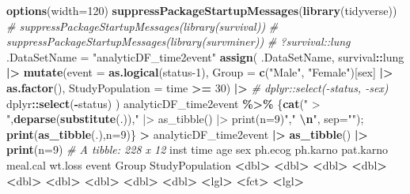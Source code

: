 \documentclass[
]{article}
\newenvironment{Shaded}{\begin{snugshade}}{\end{snugshade}}
\newcommand{\AttributeTok}[1]{\textcolor[rgb]{0.13,0.29,0.53}{#1}}
\newcommand{\CommentTok}[1]{\textcolor[rgb]{0.56,0.35,0.01}{\textit{#1}}}
\newcommand{\DecValTok}[1]{\textcolor[rgb]{0.00,0.00,0.81}{#1}}
\newcommand{\ErrorTok}[1]{\textcolor[rgb]{0.64,0.00,0.00}{\textbf{#1}}}
\newcommand{\FunctionTok}[1]{\textcolor[rgb]{0.13,0.29,0.53}{\textbf{#1}}}
\newcommand{\NormalTok}[1]{#1}
\newcommand{\OtherTok}[1]{\textcolor[rgb]{0.56,0.35,0.01}{#1}}
\newcommand{\SpecialCharTok}[1]{\textcolor[rgb]{0.81,0.36,0.00}{\textbf{#1}}}
\newcommand{\StringTok}[1]{\textcolor[rgb]{0.31,0.60,0.02}{#1}}
\begin{document}
\begin{Shaded}
\begin{Highlighting}[]
\FunctionTok{options}\NormalTok{(}\AttributeTok{width=}\DecValTok{120}\NormalTok{)}
\FunctionTok{suppressPackageStartupMessages}\NormalTok{(}\FunctionTok{library}\NormalTok{(tidyverse))}
\CommentTok{\# suppressPackageStartupMessages(library(survival))}
\CommentTok{\# suppressPackageStartupMessages(library(survminer))}
\CommentTok{\# ?survival::lung}
\NormalTok{.DataSetName }\OtherTok{=} \StringTok{"analyticDF\_time2event"}
\FunctionTok{assign}\NormalTok{(}
\NormalTok{    .DataSetName, }
\NormalTok{    survival}\SpecialCharTok{::}\NormalTok{lung }\SpecialCharTok{|\textgreater{}} \FunctionTok{mutate}\NormalTok{(}\AttributeTok{event =} \FunctionTok{as.logical}\NormalTok{(status}\DecValTok{{-}1}\NormalTok{), }\AttributeTok{Group =} \FunctionTok{c}\NormalTok{(}\StringTok{"Male"}\NormalTok{, }\StringTok{"Female"}\NormalTok{)[sex] }\SpecialCharTok{|\textgreater{}} \FunctionTok{as.factor}\NormalTok{(), }\AttributeTok{StudyPopulation =}\NormalTok{ time }\SpecialCharTok{\textgreater{}=} \DecValTok{30}\NormalTok{) }\SpecialCharTok{|\textgreater{}}
        \CommentTok{\# dplyr::select({-}status, {-}sex)}
\NormalTok{        dplyr}\SpecialCharTok{::}\FunctionTok{select}\NormalTok{(}\SpecialCharTok{{-}}\NormalTok{status)}
\NormalTok{)}
\NormalTok{analyticDF\_time2event }\SpecialCharTok{\%\textgreater{}\%}\NormalTok{ \{}\FunctionTok{cat}\NormalTok{(}\StringTok{" \textgreater{} "}\NormalTok{,}\FunctionTok{deparse}\NormalTok{(}\FunctionTok{substitute}\NormalTok{(.)),}\StringTok{" |\textgreater{} as\_tibble() |\textgreater{} print(n=9)"}\NormalTok{,}\StringTok{"  }\SpecialCharTok{\textbackslash{}n}\StringTok{"}\NormalTok{, }\AttributeTok{sep=}\StringTok{""}\NormalTok{); }\FunctionTok{print}\NormalTok{(}\FunctionTok{as\_tibble}\NormalTok{(.),}\AttributeTok{n=}\DecValTok{9}\NormalTok{)\}}
 \SpecialCharTok{\textgreater{}}\NormalTok{ analyticDF\_time2event }\SpecialCharTok{|\textgreater{}} \FunctionTok{as\_tibble}\NormalTok{() }\SpecialCharTok{|\textgreater{}} \FunctionTok{print}\NormalTok{(}\AttributeTok{n=}\DecValTok{9}\NormalTok{)  }
\CommentTok{\# A tibble: 228 x 12}
\NormalTok{   inst  time   age   sex ph.ecog ph.karno pat.karno meal.cal wt.loss event Group  StudyPopulation}
  \SpecialCharTok{\textless{}}\NormalTok{dbl}\SpecialCharTok{\textgreater{}} \ErrorTok{\textless{}}\NormalTok{dbl}\SpecialCharTok{\textgreater{}} \ErrorTok{\textless{}}\NormalTok{dbl}\SpecialCharTok{\textgreater{}} \ErrorTok{\textless{}}\NormalTok{dbl}\SpecialCharTok{\textgreater{}}   \ErrorTok{\textless{}}\NormalTok{dbl}\SpecialCharTok{\textgreater{}}    \ErrorTok{\textless{}}\NormalTok{dbl}\SpecialCharTok{\textgreater{}}     \ErrorTok{\textless{}}\NormalTok{dbl}\SpecialCharTok{\textgreater{}}    \ErrorTok{\textless{}}\NormalTok{dbl}\SpecialCharTok{\textgreater{}}   \ErrorTok{\textless{}}\NormalTok{dbl}\SpecialCharTok{\textgreater{}} \ErrorTok{\textless{}}\NormalTok{lgl}\SpecialCharTok{\textgreater{}} \ErrorTok{\textless{}}\NormalTok{fct}\SpecialCharTok{\textgreater{}}  \ErrorTok{\textless{}}\NormalTok{lgl}\SpecialCharTok{\textgreater{}}          

\end{Highlighting}
\end{Shaded}
\end{document}
